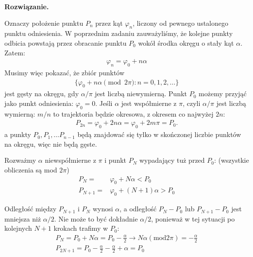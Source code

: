 \documentclass[11pt,a4paper]{article}
\newenvironment{solution}{\vspace{1cm} \par\textbf{Rozwiązanie.} \vspace{1cm}}{}
\begin{document}
\begin{solution}

Oznaczy położenie punktu $P_n$  przez kąt $\varphi_n$, 
liczony od pewnego ustalonego punktu odniesienia. W poprzednim zadaniu 
zauważyliśmy, że kolejne punkty odbicia powstają przez
obracanie punktu $P_0$ wokół środka okręgu o stały kąt $\alpha$. Zatem:
\begin{align*}
  \varphi_n = \varphi_0 + n\alpha 
\end{align*}
Musimy więc pokazać, że zbiór punktów
\begin{align*}
  \{\varphi_0 + n\alpha \pmod{2\pi} : n=0,1,2,\ldots\}
\end{align*}
jest gęsty na okręgu, gdy $\alpha/\pi$ jest liczbą niewymierną.
Punkt $P_0$ możemy przyjąć jako punkt odniesienia: $\varphi_0 = 0$.
Jeśli $\alpha$ jest współmierne z $\pi$, czyli $\alpha/\pi$ jest liczbą 
wymierną: $m/n$ to trajektoria będzie okresowa, z okresem co najwyżej $2n$:
\begin{align*}
  P_{2n} = \varphi_0 + 2n\alpha = \varphi_0 + 2m\pi = P_0.
\end{align*}
a punkty $P_0, P_1, \ldots P_{n-1}$  
będą znajdować się tylko w skończonej liczbie punktów na okręgu, więc nie 
będą gęste.

Rozważmy $\alpha$ niewspółmierne z $\pi$ i punkt $P_{N}$ wypadający tuż przed $P_0$:
(wszystkie obliczenia są mod $2\pi$)
\begin{align*}
  P_{N} =& \varphi_0 + N\alpha < P_0 \\
  P_{N+1} =& \varphi_0 + (N+1)\alpha > P_0
\end{align*}

Odległość między $P_{N+1}$ i $P_{N}$ wynosi $\alpha$, a odległość 
$P_{N} - P_{0}$ lub $P_{N+1}-P_{0}$ jest mniejsza niż $\alpha/2$.
Nie może to być dokładnie  $\alpha/2$, ponieważ w tej sytuacji 
po kolejnych ${N+1}$ krokach trafimy w $P_{0}$:
\begin{align*}
   P_{N} = P_{0}  + N\alpha = P_0 - \frac{\alpha}{2} \to N\alpha (\text{mod} 2\pi) = -\frac{\alpha}{2} \\
   P_{2N+1} = P_0 - \frac{\alpha}{2} - \frac{\alpha}{2} + \alpha = P_{0} 
\end{align*}

\begin{minipage}{0.5\textwidth}
\end{minipage}
\end{solution}
\end{document}
